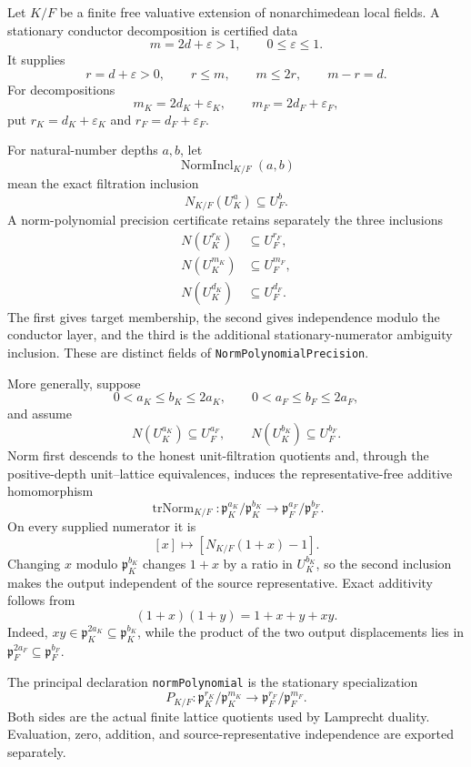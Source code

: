 \begin{definition}
\label{mod:parameters-normpolynomial}
Let $K/F$ be a finite free valuative extension of nonarchimedean local
fields.  A stationary conductor decomposition is certified data
\[
 m=2d+\varepsilon>1,\qquad 0\leq\varepsilon\leq1.
\]
It supplies
\[
 r=d+\varepsilon>0,\qquad r\leq m,\qquad m\leq2r,
 \qquad m-r=d.
\]
For decompositions
\[
 m_K=2d_K+\varepsilon_K,\qquad
 m_F=2d_F+\varepsilon_F,
\]
put $r_K=d_K+\varepsilon_K$ and $r_F=d_F+\varepsilon_F$.

For natural-number depths $a,b$, let
\[
 \operatorname{NormIncl}_{K/F}(a,b)
\]
mean the exact filtration inclusion
\[
 N_{K/F}(U_K^a)\subseteq U_F^b.
\]
A norm-polynomial precision certificate retains separately the three
inclusions
\begin{equation}\label{eq:lean-norm-polynomial-three-inclusions}
 \begin{aligned}
 N(U_K^{r_K})&\subseteq U_F^{r_F},\\
 N(U_K^{m_K})&\subseteq U_F^{m_F},\\
 N(U_K^{d_K})&\subseteq U_F^{d_F}.
 \end{aligned}
\end{equation}
The first gives target membership, the second gives independence modulo
the conductor layer, and the third is the additional stationary-numerator
ambiguity inclusion.  These are distinct fields of
\texttt{NormPolynomialPrecision}.

More generally, suppose
\[
 0<a_K\leq b_K\leq2a_K,\qquad
 0<a_F\leq b_F\leq2a_F,
\]
and assume
\[
 N(U_K^{a_K})\subseteq U_F^{a_F},
 \qquad
 N(U_K^{b_K})\subseteq U_F^{b_F}.
\]
Norm first descends to the honest unit-filtration quotients and, through
the positive-depth unit--lattice equivalences, induces the
representative-free additive homomorphism
\[
 \operatorname{trNorm}_{K/F}:
 \mathfrak p_K^{a_K}/\mathfrak p_K^{b_K}
 \longrightarrow
 \mathfrak p_F^{a_F}/\mathfrak p_F^{b_F}.
\]
On every supplied numerator it is
\[
 [x]\longmapsto[N_{K/F}(1+x)-1].
\]
Changing $x$ modulo $\mathfrak p_K^{b_K}$ changes $1+x$ by a ratio in
$U_K^{b_K}$, so the second inclusion makes the output independent of the
source representative.  Exact additivity follows from
\[
 (1+x)(1+y)=1+x+y+xy.
\]
Indeed,
$xy\in\mathfrak p_K^{2a_K}\subseteq\mathfrak p_K^{b_K}$, while the
product of the two output displacements lies in
$\mathfrak p_F^{2a_F}\subseteq\mathfrak p_F^{b_F}$.

The principal declaration \texttt{normPolynomial} is the stationary
specialization
\[
 P_{K/F}:
 \mathfrak p_K^{r_K}/\mathfrak p_K^{m_K}
 \longrightarrow
 \mathfrak p_F^{r_F}/\mathfrak p_F^{m_F}.
\]
Both sides are the actual finite lattice quotients used by Lamprecht
duality.  Evaluation, zero, addition, and source-representative
independence are exported separately.


\end{definition}
